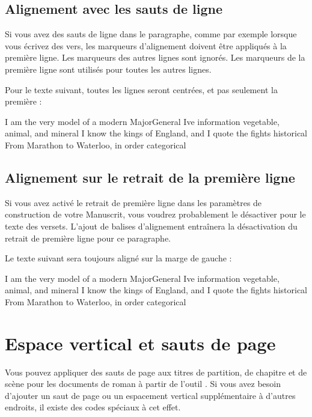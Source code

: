 \documentclass[a4paper,11pt,french]{sphinxmanual}
\begin{document}
\subsection{Alignement avec les sauts de ligne}
\label{\detokenize{usage_format:alignment-with-line-breaks}}
\sphinxAtStartPar
Si vous avez des sauts de ligne dans le paragraphe, comme par exemple lorsque vous écrivez des vers, les marqueurs d’alignement doivent être appliqués à la première ligne. Les marqueurs des autres lignes sont ignorés. Les marqueurs de la première ligne sont utilisés pour toutes les autres lignes.

\sphinxAtStartPar
Pour le texte suivant, toutes les lignes seront centrées, et pas seulement la première :

\begin{sphinxVerbatim}[commandchars=\\\{\}]
\PYGZgt{}\PYGZgt{} I am the very model of a modern Major\PYGZhy{}General \PYGZlt{}\PYGZlt{}
I\PYGZsq{}ve information vegetable, animal, and mineral
I know the kings of England, and I quote the fights historical
From Marathon to Waterloo, in order categorical
\end{sphinxVerbatim}


\subsection{Alignement sur le retrait de la première ligne}
\label{\detokenize{usage_format:alignment-with-first-line-indent}}
\sphinxAtStartPar
Si vous avez activé le retrait de première ligne dans les paramètres de construction de votre Manuscrit, vous voudrez probablement le désactiver pour le texte des versets. L’ajout de balises d’alignement entraînera la désactivation du retrait de première ligne pour ce paragraphe.

\sphinxAtStartPar
Le texte suivant sera toujours aligné sur la marge de gauche :

\begin{sphinxVerbatim}[commandchars=\\\{\}]
I am the very model of a modern Major\PYGZhy{}General \PYGZlt{}\PYGZlt{}
I\PYGZsq{}ve information vegetable, animal, and mineral
I know the kings of England, and I quote the fights historical
From Marathon to Waterloo, in order categorical
\end{sphinxVerbatim}


\section{Espace vertical et sauts de page}
\label{\detokenize{usage_format:vertical-space-and-page-breaks}}\label{\detokenize{usage_format:a-fmt-break}}
\sphinxAtStartPar
Vous pouvez appliquer des sauts de page aux titres de partition, de chapitre et de scène pour les documents de roman à partir de l’outil . Si vous avez besoin d’ajouter un saut de page ou un espacement vertical supplémentaire à d’autres endroits, il existe des codes spéciaux à cet effet.
\end{document}
